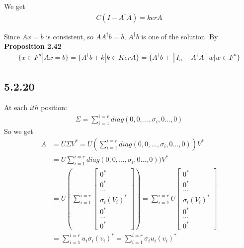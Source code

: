 \documentclass{article}
\begin{document}
We get 
\begin{equation*}
    \begin{split}
        C(I - A^\dagger A) = kerA 
    \end{split}
\end{equation*}

Since $Ax = b$ is consistent, so $AA^\dagger b = b$, $A ^\dagger b$ is one of the solution. By \textbf{Proposition 2.42}
\begin{equation*}
    \begin{split}
        \{ x \in F^n | Ax = b\} = \{ A^\dagger b + k | k \in KerA \} = \{ A^\dagger b + [I_n - A^\dagger A]w | w \in F^n \}
    \end{split}
\end{equation*}

\subsection*{5.2.20}
At each $ith$ position:
\begin{equation*}
    \begin{split}
        \Sigma = \sum_{i = 1}^{i = r} diag(0, 0, ..., \sigma_i, 0..., 0)
    \end{split}
\end{equation*}
So we get 
\begin{equation*}
    \begin{split}
        A & = U \Sigma V^* = U (\sum_{i = 1}^{i = r} diag(0, 0, ..., \sigma_i, 0..., 0))  V^* \\
        & = U\sum_{i = 1}^{i = r} diag(0, 0, ..., \sigma_i, 0..., 0)) V^* \\
        & = U(\sum_{i = 1}^{i = r} \begin{bmatrix}
            0^* \\ 0^* \\ ... \\ \sigma_i(V_i)^* \\ 0^* \\ ... \\ 0^*
        \end{bmatrix}) = \sum_{i = 1}^{i = r} U \begin{bmatrix}
            0^* \\ 0^* \\ ... \\ \sigma_i(V_i)^* \\ 0^* \\ ... \\ 0^*
        \end{bmatrix} \\
        & = \sum_{i = 1}^{i = r} u_i \sigma_i (v_i)^* = \sum_{i = 1}^{i = r} \sigma_i u_i  (v_i)^*
    \end{split}
\end{equation*}
\end{document}
